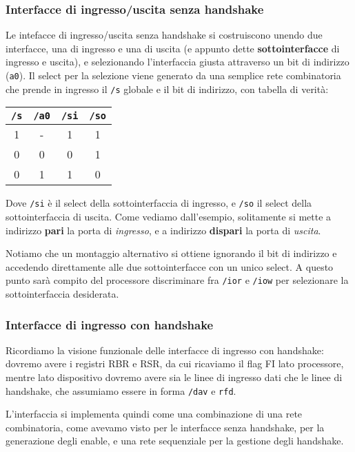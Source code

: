 \documentclass[a4paper,11pt]{article}
\begin{document}
\subsubsection{Interfacce di ingresso/uscita senza handshake}
Le intefacce di ingresso/uscita senza handshake si costruiscono unendo due interfacce, una di ingresso e una di uscita (e appunto dette \textbf{sottointerfacce} di ingresso e uscita), e selezionando l'interfaccia giusta attraverso un bit di indirizzo (\lstinline|a0|).
Il select per la selezione viene generato da una semplice rete combinatoria che prende in ingresso il \lstinline|/s| globale e il bit di indirizzo, con tabella di verità:
\begin{table}[h!]
	\center 
	\begin{tabular} { c  c | c  c }
		\lstinline|/s| & \lstinline|/a0| & \lstinline|/si| & \lstinline|/so| \\ 
		\hline 
		1 & - & 1 & 1 \\ 
		0 & 0 & 0 & 1 \\ 
		0 & 1 & 1 & 0 
	\end{tabular}
\end{table}
Dove \lstinline|/si| è il select della sottointerfaccia di ingresso, e \lstinline|/so| il select della sottointerfaccia di uscita.
Come vediamo dall'esempio, solitamente si mette a indirizzo \textbf{pari} la porta di \textit{ingresso}, e a indirizzo \textbf{dispari} la porta di \textit{uscita}.

Notiamo che un montaggio alternativo si ottiene ignorando il bit di indirizzo e accedendo direttamente alle due sottointerfacce con un unico select.
A questo punto sarà compito del processore discriminare fra \lstinline|/ior| e \lstinline|/iow| per selezionare la sottointerfaccia desiderata.

\subsubsection{Interfacce di ingresso con handshake}
Ricordiamo la visione funzionale delle interfacce di ingresso con handshake: dovremo avere i registri RBR e RSR, da cui ricaviamo il flag FI lato processore, mentre lato dispositivo dovremo avere sia le linee di ingresso dati che le linee di handshake, che assumiamo essere in forma \lstinline|/dav| e \lstinline|rfd|.

L'interfaccia si implementa quindi come una combinazione di una rete combinatoria, come avevamo visto per le interfacce senza handshake, per la generazione degli enable, e una rete sequenziale per la gestione degli handshake.
\end{document}
